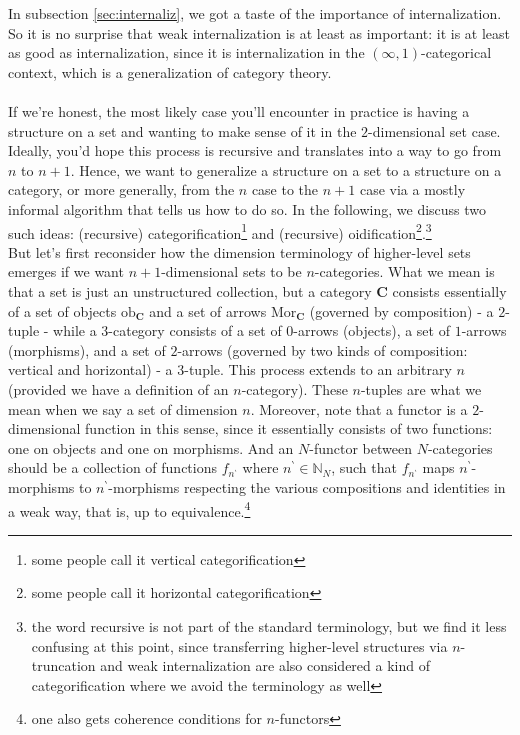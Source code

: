 In subsection \ref{sec:internaliz}, we got a taste of the importance of internalization.
So it is no surprise that weak internalization is at least as important: it is at least as good as internalization, since it is internalization in the $(\infty,1)$-categorical context, which is a generalization of category theory.
\\\\
If we're honest, the most likely case you'll encounter in practice is having a structure on a set and wanting to make sense of it in the $2$-dimensional set case.
Ideally, you'd hope this process is recursive and translates into a way to go from $n$ to $n+1$.
Hence, we want to generalize a structure on a set to a structure on a category, or more generally, from the $n$ case to the $n+1$ case via a mostly informal algorithm that tells us how to do so.
In the following, we discuss two such ideas: (recursive) categorification\footnote{some people call it vertical categorification} and (recursive) oidification\footnote{some people call it horizontal categorification}.\footnote{the word recursive is not part of the standard terminology, but we find it less confusing at this point, since transferring higher-level structures via $n$-truncation and weak internalization are also considered a kind of categorification where we avoid the terminology as well}
\\
But let's first reconsider how the dimension terminology of higher-level sets emerges if we want $n+1$-dimensional sets to be $n$-categories.
What we mean is that a set is just an unstructured collection, but a category $\mathbf{C}$ consists essentially of a set of objects $\mathrm{ob}_{\mathbf{C}}$ and a set of arrows $\mathrm{Mor}_{\mathbf{C}}$ (governed by composition) - a $2$-tuple - while a $3$-category consists of a set of $0$-arrows (objects), a set of $1$-arrows (morphisms), and a set of $2$-arrows (governed by two kinds of composition: vertical and horizontal) - a $3$-tuple.
This process extends to an arbitrary $n$ (provided we have a definition of an $n$-category).
These $n$-tuples are what we mean when we say a set of dimension $n$.
Moreover, note that a functor is a $2$-dimensional function in this sense, since it essentially consists of two functions: one on objects and one on morphisms.
And an $N$-functor between $N$-categories should be a collection of functions $f_{n^{\backprime}}$ where $n^{\backprime} \in \mathbb{N}_{N}$, such that $f_{n^{\backprime}}$ maps $n^{\backprime}$-morphisms to $n^{\backprime}$-morphisms respecting the various compositions and identities in a weak way, that is, up to equivalence.\footnote{one also gets coherence conditions for $n$-functors}
